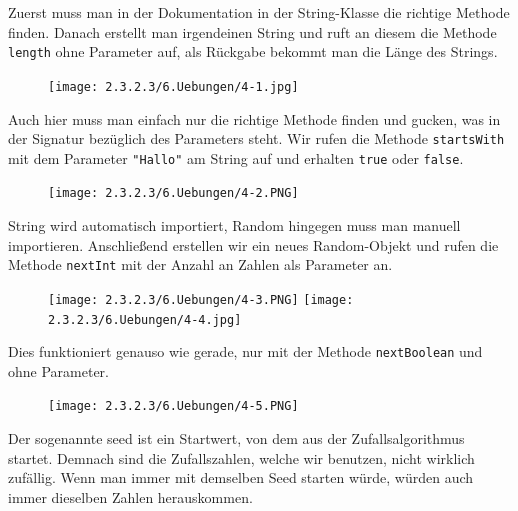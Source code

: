 \documentclass{scrartcl}   %
\begin{document}
\begin{itemize}
    \barrow Zuerst muss man in der Dokumentation in der String-Klasse die richtige Methode finden. Danach erstellt man irgendeinen String und ruft an diesem die Methode \texttt{length} ohne Parameter auf, als Rückgabe bekommt man die Länge des Strings.
    
    \begin{figure}[ht]
	    \centering
	    \texttt{[image: 2.3.2.3/6.Uebungen/4-1.jpg]}
    \end{figure}
    
    \barrow Auch hier muss man einfach nur die richtige Methode finden und gucken, was in der Signatur bezüglich des Parameters steht. Wir rufen die Methode \texttt{startsWith} mit dem Parameter \texttt{"Hallo"} am String auf und erhalten \texttt{true} oder \texttt{false}.
    
    \begin{figure}[ht]
	    \centering
	    \texttt{[image: 2.3.2.3/6.Uebungen/4-2.PNG]}
    \end{figure}
	    
    \barrow String wird automatisch importiert, Random hingegen muss man manuell importieren. Anschließend erstellen wir ein neues Random-Objekt und rufen die Methode \texttt{nextInt} mit der Anzahl an Zahlen als Parameter an.
    
    \begin{figure}[ht]
	    \centering
	    \texttt{[image: 2.3.2.3/6.Uebungen/4-3.PNG]}
	    \hspace{1cm}
	    \texttt{[image: 2.3.2.3/6.Uebungen/4-4.jpg]}
    \end{figure}
    
    \newpage
    
    \barrow Dies funktioniert genauso wie gerade, nur mit der Methode \texttt{nextBoolean} und ohne Parameter.
    
    \begin{figure}[ht]
	    \centering
	    \texttt{[image: 2.3.2.3/6.Uebungen/4-5.PNG]}
    \end{figure}
    
    \vspace{2cm}
    
    \barrow Der sogenannte \glqq seed\grqq{} ist ein Startwert, von dem aus der Zufallsalgorithmus startet. Demnach sind die Zufallszahlen, welche wir benutzen, nicht wirklich zufällig. Wenn man immer mit demselben Seed starten würde, würden auch immer dieselben Zahlen herauskommen.
    

\end{itemize}
\end{document}
